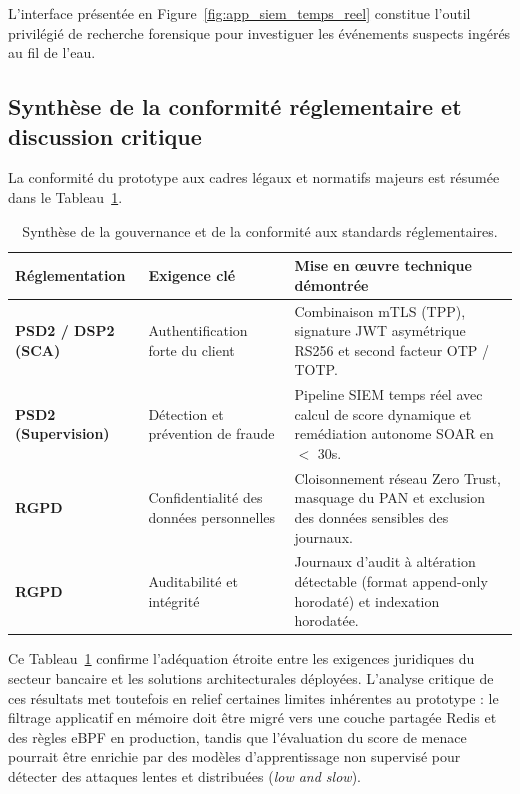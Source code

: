 L'interface présentée en Figure~\ref{fig:app_siem_temps_reel} constitue l'outil privilégié de recherche forensique pour investiguer les événements suspects ingérés au fil de l'eau.

\subsection{Synthèse de la conformité réglementaire et discussion critique}
La conformité du prototype aux cadres légaux et normatifs majeurs est résumée dans le Tableau~\ref{tab:compliance}.

\begin{table}[!htbp]
    \centering
    \small
    \begin{tabular}{|p{3.2cm}|p{3.8cm}|p{6cm}|}
        \hline
        \textbf{Réglementation} & \textbf{Exigence clé} & \textbf{Mise en œuvre technique démontrée} \\ \hline
        \textbf{PSD2 / DSP2 (SCA)} & Authentification forte du client & Combinaison mTLS (TPP), signature JWT asymétrique RS256 et second facteur OTP / TOTP. \\ \hline
        \textbf{PSD2 (Supervision)} & Détection et prévention de fraude & Pipeline SIEM temps réel avec calcul de score dynamique et remédiation autonome SOAR en $<$ 30s. \\ \hline
        \textbf{RGPD} & Confidentialité des données personnelles & Cloisonnement réseau Zero Trust, masquage du PAN et exclusion des données sensibles des journaux. \\ \hline
        \textbf{RGPD} & Auditabilité et intégrité & Journaux d'audit à altération détectable (format append-only horodaté) et indexation horodatée. \\ \hline
    \end{tabular}
    \caption{Synthèse de la gouvernance et de la conformité aux standards réglementaires.}
    \label{tab:compliance}
\end{table}

Ce Tableau~\ref{tab:compliance} confirme l'adéquation étroite entre les exigences juridiques du secteur bancaire et les solutions architecturales déployées. L'analyse critique de ces résultats met toutefois en relief certaines limites inhérentes au prototype : le filtrage applicatif en mémoire doit être migré vers une couche partagée Redis et des règles eBPF en production, tandis que l'évaluation du score de menace pourrait être enrichie par des modèles d'apprentissage non supervisé pour détecter des attaques lentes et distribuées (\textit{low and slow}).


